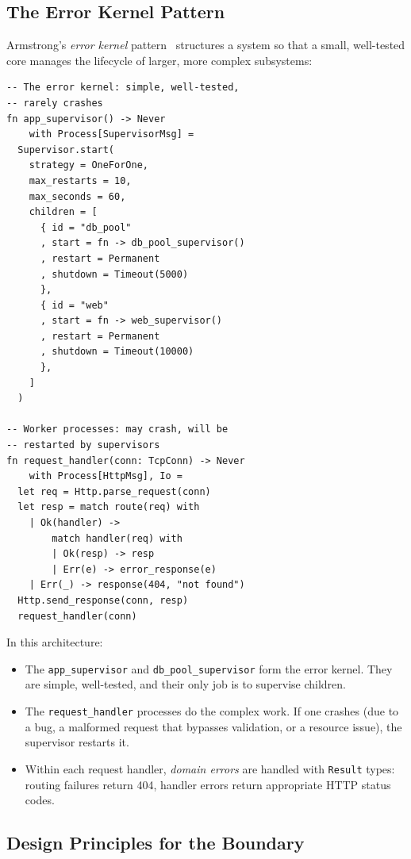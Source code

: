 \documentclass[11pt,twocolumn]{article}
\newcommand{\Result}{\texttt{Result}}
\begin{document}
\subsection{The Error Kernel Pattern}

Armstrong's \emph{error kernel} pattern~\cite{armstrong2003thesis} structures a system so that a small, well-tested core manages the lifecycle of larger, more complex subsystems:

\begin{lstlisting}
-- The error kernel: simple, well-tested,
-- rarely crashes
fn app_supervisor() -> Never
    with Process[SupervisorMsg] =
  Supervisor.start(
    strategy = OneForOne,
    max_restarts = 10,
    max_seconds = 60,
    children = [
      { id = "db_pool"
      , start = fn -> db_pool_supervisor()
      , restart = Permanent
      , shutdown = Timeout(5000)
      },
      { id = "web"
      , start = fn -> web_supervisor()
      , restart = Permanent
      , shutdown = Timeout(10000)
      },
    ]
  )

-- Worker processes: may crash, will be
-- restarted by supervisors
fn request_handler(conn: TcpConn) -> Never
    with Process[HttpMsg], Io =
  let req = Http.parse_request(conn)
  let resp = match route(req) with
    | Ok(handler) ->
        match handler(req) with
        | Ok(resp) -> resp
        | Err(e) -> error_response(e)
    | Err(_) -> response(404, "not found")
  Http.send_response(conn, resp)
  request_handler(conn)
\end{lstlisting}

In this architecture:
\begin{itemize}[leftmargin=*]
  \item The \texttt{app\_supervisor} and \texttt{db\_pool\_supervisor} form the error kernel. They are simple, well-tested, and their only job is to supervise children.
  \item The \texttt{request\_handler} processes do the complex work. If one crashes (due to a bug, a malformed request that bypasses validation, or a resource issue), the supervisor restarts it.
  \item Within each request handler, \emph{domain errors} are handled with \Result{} types: routing failures return 404, handler errors return appropriate HTTP status codes.
\end{itemize}

\subsection{Design Principles for the Boundary}
\end{document}
